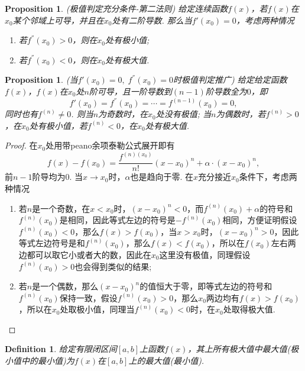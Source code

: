 \documentclass{article}
\newtheorem{proposition}[theorem]{Proposition}
\newtheorem{definition}[theorem]{Definition}
\begin{document}
\begin{proposition}
\rm {\color{red} (极值判定充分条件-第二法则)} \rm 给定连续函数$f(x)$，若$f(x)$在$x_0$某个邻域上可导，并且在$x_0$处有二阶导数. 那么当$f'(x_0) = 0$，考虑两种情况
\begin{enumerate}
	\item 若$f^{''}(x_0) > 0$，则在$x_0$处有极小值;
	\item 若$f^{''}(x_0) < 0$，则在$x_0$处有极大值.
\end{enumerate}
\end{proposition}

\begin{proposition}
\rm {\color{red} (当$f'(x_0) = 0,\; f^{''}(x_0) = 0$时极值判定推广)} 给定给定函数$f(x)$，$f(x)$在$x_0$处$n$阶可导，且一阶导数到$(n-1)$阶导数全为$0$，即
$$
f'(x_0) = f^{''}(x_0) = \cdots = f^{(n-1)}(x_0) = 0,
$$
同时也有$f^{(n)} \neq 0$. 则当$n$为奇数时，在$x_0$处没有极值; 当$n$为偶数时，若$f^{(n)} > 0$，在$x_0$处有极小值，若$f^{(n)} < 0$，在$x_0$处有极大值.
\end{proposition}

\begin{proof}
在$x_0$处用带peano余项泰勒公式展开即有
$$
f(x) - f(x_0) = \frac{f^{(n)(x_0)}}{n!}(x-x_0)^n + \alpha\cdot( x-x_0)^n,
$$
前$n-1$阶导均为0. 当$x \rightarrow x_0$时，$\alpha$也是趋向于零. 在$x$充分接近$x_0$条件下，考虑两种情况
\begin{enumerate}
\item 若$n$是一个奇数，在$x < x_0$时，$(x-x_0)^n < 0$，而$f^{(n)}(x_0)+\alpha$的符号和$f^{(n)}(x_0)$是相同，因此等式左边的符号是$-f^{(n)}(x_0)$相同，方便证明假设$f^{(n)}(x_0) < 0$，那么$f(x) > f(x_0)$，当$x > x_0$时，$(x-x_0)^n > 0$，因此等式左边符号是和$f^{(n)}(x_0)$，那么$f(x) < f(x_0)$，所以在$f(x_0)$左右两边都可以取它小或者大的数，因此在$x_0$这里没有极值，同理假设$f^{(n)}(x_0) > 0$也会得到类似的结果;

\item 若$n$是一个偶数，那么$(x-x_0)^n$的值恒大于零，即等式左边的符号和$f^{(n)}(x_0)$保持一致，假设$f^{(n)}(x_0) > 0$，那么$x_0$两边均有$f(x) > f(x_0)$，所以在$x_0$处取极小值，同理当$f^{(n)}(x_0) < 0$时，在$x_0$处取得极大值.
\end{enumerate}
\end{proof}

\begin{definition}
\rm 给定有限闭区间$[a,b]$上函数$f(x)$，其上所有极大值中最大值(极小值中的最小值)为$f(x)$在$[a,b]$上的{\color{red}最大值(最小值)}.
\end{definition}
\end{document}
